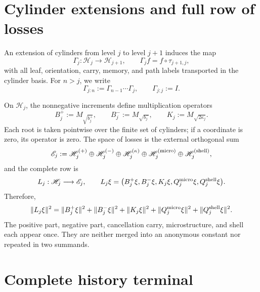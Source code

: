 \section{Cylinder extensions and full row of losses}
\label{sec:pdfv2-sol-gamma-loss}

An extension of cylinders from level \(j\) to level \(j+1\) induces the map
\begin{equation}\label{eq:pdfv2-sol-gamma}
 \Gamma_j:\mathscr H_j\longrightarrow\mathscr H_{j+1},
 \qquad
 \Gamma_j f=f\circ\tau_{j+1,j},
\end{equation}
with all leaf, orientation, carry, memory, and path labels
transported in the cylinder basis.  For \(n>j\), we write
\begin{equation}\label{eq:pdfv2-sol-gamma-composition}
 \Gamma_{j:n}:=\Gamma_{n-1}\cdots\Gamma_j,
 \qquad
 \Gamma_{j:j}:=I.
\end{equation}

On \(\mathscr H_j\), the nonnegative increments define multiplication
operators
\begin{equation}\label{eq:pdfv2-sol-loss-multipliers}
 B_j^+:=M_{\sqrt{b_j^+}},
 \qquad
 B_j^-:=M_{\sqrt{b_j^-}},
 \qquad
 K_j:=M_{\sqrt{2\kappa_j}}.
\end{equation}
Each root is taken pointwise over the finite set of cylinders; if a
coordinate is zero, its operator is zero.  The space of losses is the external
orthogonal sum
\[
 \mathscr E_j
 :=\mathscr H_j^{(+)}\oplus\mathscr H_j^{(-)}
   \oplus\mathscr H_j^{(\kappa)}
   \oplus\mathscr H_j^{({\rm micro})}
   \oplus\mathscr H_j^{({\rm shell})},
\]
and the complete row is
\begin{equation}\label{eq:pdfv2-sol-loss-row}
 L_j:\mathscr H_j\longrightarrow\mathscr E_j,
 \qquad
 L_j\xi
 =\bigl(
 B_j^+\xi,B_j^-\xi,K_j\xi,
 Q_j^{\rm micro}\xi,Q_j^{\rm shell}\xi
 \bigr).
\end{equation}
Therefore,
\begin{equation}\label{eq:pdfv2-sol-loss-norm}
 \|L_j\xi\|^2
 =\|B_j^+\xi\|^2+\|B_j^-\xi\|^2+\|K_j\xi\|^2
  +\|Q_j^{\rm micro}\xi\|^2
  +\|Q_j^{\rm shell}\xi\|^2.
\end{equation}
The positive part, negative part, cancellation carry, microstructure, and shell
each appear once. They are neither merged into an anonymous constant nor
repeated in two summands.

\section{Complete history terminal}
\label{sec:pdfv2-sol-terminal}

